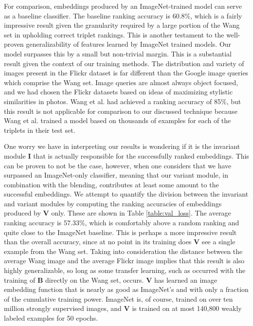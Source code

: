For comparison, embeddings produced by an ImageNet-trained model can serve as a baseline classifier. The baseline ranking accuracy is 60.8\%, which is a fairly impressive result given the granularity required by a large portion of the Wang set in upholding correct triplet rankings. This is another testament to the well-proven generalizability of features learned by ImageNet trained models. Our model surpasses this by a small but non-trivial margin. This is a substantial result given the context of our training methods. The distribution and variety of images present in the Flickr dataset is far different than the Google image queries which comprise the Wang set. Image queries are almost always object focused, and we had chosen the Flickr datasets based on ideas of maximizing stylistic similarities in photos. Wang et al. had achieved a ranking accuracy of 85\%, but this result is not applicable for comparison to our discussed technique because Wang et al. trained a model based on thousands of examples for each of the triplets in their test set.

One worry we have in interpreting our results is wondering if it is the invariant module $\mathbf{I}$ that is actually responsible for the successfully ranked embeddings. This can be proven to not be the case, however, when one considers that we have surpassed an ImageNet-only classifier, meaning that our variant module, in combination with the blending, contributes at least some amount to the successful embeddings. We attempt to quantify the division between the invariant and variant modules by computing the ranking accuracies of embeddings produced by $\mathbf{V}$ only. These are shown in Table \ref{table:val_loss}. The average ranking accuracy is 57.33\%, which is comfortably above a random ranking and quite close to the ImageNet baseline. This is perhaps a more impressive result than the overall accuracy, since at no point in its training does $\mathbf{V}$ see a single example from the Wang set. Taking into consideration the distance between the average Wang image and the average Flickr image implies that this result is also highly generalizable, so long as some transfer learning, such as occurred with the training of $\mathbf{B}$ directly on the Wang set, occurs. $\mathbf{V}$ has learned an image embedding function that is nearly as good as ImageNet's and with only a fraction of the cumulative training power. ImageNet is, of course, trained on over ten million strongly supervised images, and $\mathbf{V}$ is trained on at most 140,800 weakly labeled examples for 50 epochs.

